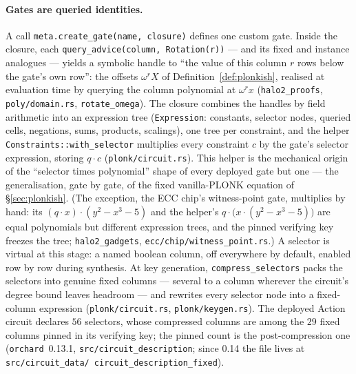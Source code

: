 \documentclass[11pt,a4paper]{article}
\theoremstyle{definition}
\begin{document}
\paragraph{Gates are queried identities.}
A call \texttt{meta.create\_gate(name, closure)} defines one custom gate.
Inside the closure, each \texttt{query\_advice(column, Rotation(r))} --- and
its fixed and instance analogues --- yields a symbolic handle to ``the value
of this column $r$ rows below the gate's own row'': the offsets $\omega^r X$
of Definition~\ref{def:plonkish}, realised at evaluation time by querying
the column polynomial at $\omega^r x$ (\texttt{halo2\_proofs},
\texttt{poly/domain.rs}, \texttt{rotate\_omega}). The closure combines the
handles by field arithmetic into an expression tree
(\texttt{Expression}: constants, selector nodes, queried cells, negations,
sums, products, scalings), one tree per constraint, and the helper
\texttt{Constraints::with\_selector} multiplies every constraint $c$ by the
gate's selector expression, storing $q \cdot c$
(\texttt{plonk/circuit.rs}). This helper is the mechanical origin of the
``selector times polynomial'' shape of every deployed gate but one --- the
generalisation, gate by gate, of the fixed vanilla-PLONK equation of
\S\ref{sec:plonkish}. (The exception, the ECC chip's witness-point gate,
multiplies by hand: its $(q \cdot x) \cdot (y^2 - x^3 - 5)$ and the
helper's $q \cdot \bigl( x \cdot (y^2 - x^3 - 5) \bigr)$ are equal
polynomials but different expression trees, and the pinned verifying key
freezes the tree; \texttt{halo2\_gadgets},
\texttt{ecc/chip/witness\_point.rs}.) A selector is virtual at this
stage: a named boolean
column, off everywhere by default, enabled row by row during synthesis. At
key generation, \texttt{compress\_selectors} packs the selectors into
genuine fixed columns --- several to a column wherever the circuit's degree
bound leaves headroom --- and rewrites every selector node into a
fixed-column expression (\texttt{plonk/circuit.rs},
\texttt{plonk/keygen.rs}). The deployed Action circuit declares $56$
selectors, whose compressed columns are among the $29$ fixed columns pinned
in its verifying key; the pinned count is the post-compression one
(\texttt{orchard}~0.13.1, \texttt{src/circuit\_description}; since 0.14
the file lives at \texttt{src/circuit\_data/\allowbreak
circuit\_description\_fixed}).
\end{document}
